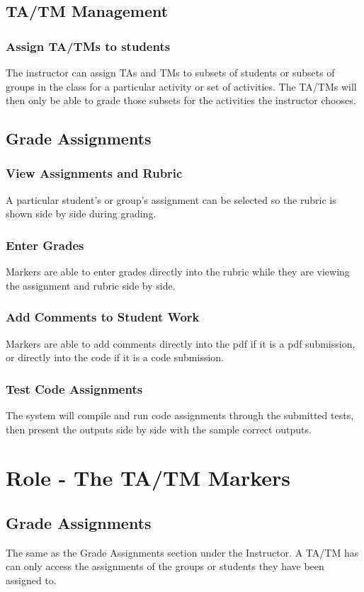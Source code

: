 \documentclass{article}
\begin{document}
\subsection{TA/TM Management}
\subsubsection{Assign TA/TMs to students}
The instructor can assign TAs and TMs to subsets of students or subsets of 
groups in the class for a particular activity or set of activities. The TA/TMs will then
only be able to grade those subsets for the activities the instructor chooses.
\subsection{Grade Assignments}
\subsubsection{View Assignments and Rubric}
A particular student's or group's assignment can be selected so the rubric is
shown side by side during grading.
\subsubsection{Enter Grades}
Markers are able to enter grades directly into the rubric while they are viewing
the assignment and rubric side by side.
\subsubsection{Add Comments to Student Work}
Markers are able to add comments directly into the pdf if it is a pdf submission,
or directly into the code if it is a code submission.
\subsubsection{Test Code Assignments}
The system will compile and run code assignments through the submitted tests,
then present the outputs side by side with the sample correct outputs.


\section{Role - The TA/TM Markers}
\subsection{Grade Assignments}
The same as the Grade Assignments section under the Instructor.
A TA/TM has can only access the assignments of the groups or students they
have been assigned to.
\end{document}
